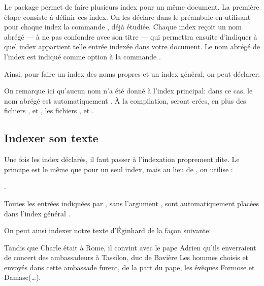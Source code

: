 Le package  permet de faire plusieurs index pour un même document. La première étape consiste à définir ces index. On les déclare dans le préambule en utilisant pour chaque index la commande , déjà étudiée. Chaque index reçoit un nom  abrégé --- à ne pas confondre avec son titre --- qui permettra ensuite d'indiquer  à quel index appartient telle entrée indexée dans votre document. Le nom abrégé de l'index est indiqué comme  option à la commande  .


Ainsi, pour faire un index des noms propres et un index général, on peut déclarer:

\begin{latexcode}
\makeindex[title=Index principal]
\makeindex[name=npr, title=Index des noms propres] 
\end{latexcode}

On remarque ici qu'aucun nom n'a été donné à l'index principal: dans ce cas, le nom abrégé est automatiquement . À la compilation, seront crées, en plus  des fichiers ,  et ,  les fichiers ,  et .


\subsection{Indexer son texte}
Une fois  les index déclarés, il faut passer à l'indexation proprement dite. Le principe est le même que pour un seul index,
mais au lieu de , on utilise : 

. 

\begin{plusloins}
Toutes les entrées indiquées  par , sans l'argument , sont automatiquement placées dans l'index général .
\end{plusloins}

On peut ainsi indexer notre texte d'Éginhard de la façon suivante:

\begin{latexcode}
Tandis que Charle était à Rome, il convint
avec le pape Adrien qu’ils enverraient de concert
des ambassadeurs à Tassilon, duc de Bavière
\textelp{}
Les hommes choisis et envoyés dans cette ambassade furent, de 
la part du pape, les évêques Formose et 
Damase(…).
\end{latexcode}



